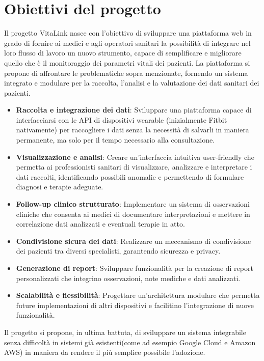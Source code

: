 \documentclass[12pt,a4paper,oneside]{report}
\begin{document}
\section{Obiettivi del progetto}
Il progetto VitaLink nasce con l'obiettivo di sviluppare una piattaforma web in grado di fornire ai medici e agli operatori sanitari la possibilità di integrare nel loro flusso di lavoro un nuovo strumento, capace di semplificare e migliorare quello che è il monitoraggio dei parametri vitali dei pazienti.
La piattaforma si propone di affrontare le problematiche sopra menzionate, fornendo un sistema integrato e modulare per la raccolta, l'analisi e la valutazione dei dati sanitari dei pazienti.

\begin{itemize}
    \item \textbf{Raccolta e integrazione dei dati}: Sviluppare una piattaforma capace di interfacciarsi con le API di dispositivi wearable (inizialmente Fitbit nativamente) per raccogliere i dati senza la necessità di salvarli in maniera permanente, ma solo per il tempo necessario alla consultazione.
    \item \textbf{Visualizzazione e analisi}: Creare un'interfaccia intuitiva user-friendly che permetta ai professionisti sanitari di visualizzare, analizzare e interpretare i dati raccolti, identificando possibili anomalie e permettendo di formulare diagnosi e terapie adeguate.
    \item \textbf{Follow-up clinico strutturato}: Implementare un sistema di osservazioni cliniche che consenta ai medici di documentare interpretazioni e mettere in correlazione dati analizzati e eventuali terapie in atto.
    \item \textbf{Condivisione sicura dei dati}: Realizzare un meccanismo di condivisione dei pazienti tra diversi specialisti, garantendo sicurezza e privacy.
    \item \textbf{Generazione di report}: Sviluppare funzionalità per la creazione di report personalizzati che integrino osservazioni, note mediche e dati analizzati.
    \item \textbf{Scalabilità e flessibilità}: Progettare un'architettura modulare che permetta future implementazioni di altri dispositivi e facilitino l'integrazione di nuove funzionalità.
\end{itemize}

Il progetto si propone, in ultima battuta, di sviluppare un sistema integrabile senza difficoltà in sistemi già esistenti(come ad esempio Google Cloud e Amazon AWS) in maniera da rendere il più semplice possibile l'adozione.
\end{document}
